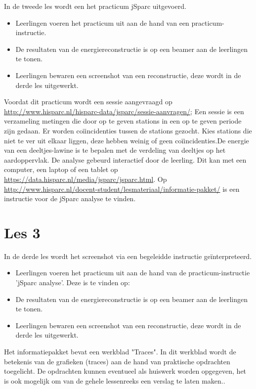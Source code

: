 In de tweede les wordt een het practicum jSparc uitgevoerd.

\begin{itemize}
\item Leerlingen voeren het practicum uit aan de hand van een practicum-instructie.
\item De resultaten van de energiereconstructie is op een beamer aan de leerlingen te tonen.
\item Leerlingen bewaren een screenshot van een reconstructie, deze wordt in de derde les uitgewerkt.
\end{itemize}

Voordat dit practicum wordt een sessie aangevraagd op \url{http://www.hisparc.nl/hisparc-data/jsparc/sessie-aanvragen/}; Een sessie is een verzameling metingen die door op te geven stations in een op te geven periode zijn gedaan. Er worden co\"{i}incidenties tussen de stations gezocht. Kies stations die niet te ver uit elkaar liggen, deze hebben weinig of geen co\"{i}incidenties.De energie van een deeltjes-lawine is te bepalen met de verdeling van deeltjes op het aardoppervlak. De analyse gebeurd interactief door de leerling. Dit kan met een computer, een laptop of een tablet op \url{https://data.hisparc.nl/media/jsparc/jsparc.html}. Op \url{http://www.hisparc.nl/docent-student/lesmateriaal/informatie-pakket/} is een instructie voor de jSparc analyse te vinden. 

\section{Les 3}

In de derde les wordt het screenshot via een begeleidde instructie ge\"interpreteerd.
\begin{itemize}
\item Leerlingen voeren het practicum uit aan de hand van de practicum-instructie 'jSparc analyse'. Deze is te vinden op: \url{}
\item De resultaten van de energiereconstructie is op een beamer aan de leerlingen te tonen.
\item Leerlingen bewaren een screenshot van een reconstructie, deze wordt in de derde les uitgewerkt.
\end{itemize}

Het informatiepakket bevat een werkblad "Traces". In dit werkblad wordt de betekenis van de grafieken (traces) aan de hand van praktische opdrachten toegelicht. De opdrachten kunnen eventueel als huiswerk worden opgegeven, het is ook mogelijk om van de gehele lessenreeks een verslag te laten maken..

